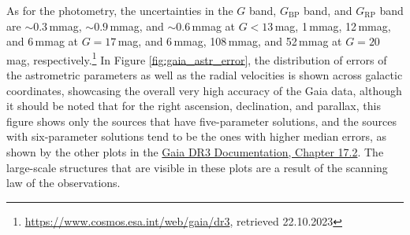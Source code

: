 \documentclass[a4paper,11pt]{article}
\begin{document}
%
As for the photometry, the uncertainties in the $G$ band, $G_\mathrm{BP}$ band, and $G_\mathrm{RP}$ band are ${\sim}0.3$\,mmag, ${\sim}0.9$\,mmag, and ${\sim}0.6$\,mmag at $G<13$\,mag, 1\,mmag, 12\,mmag, and 6\,mmag at $G=17$\,mag, and 6\,mmag, 108\,mmag, and 52\,mmag at $G=20$\,mag, respectively.\footnote{\url{https://www.cosmos.esa.int/web/gaia/dr3}, retrieved 22.10.2023} In Figure \ref{fig:gaia_astr_error}, the distribution of errors of the astrometric parameters as well as the radial velocities is shown across galactic coordinates, showcasing the overall very high accuracy of the Gaia data, although it should be noted that for the right ascension, declination, and parallax, this figure shows only the sources that have five-parameter solutions, and the sources with six-parameter solutions tend to be the ones with higher median errors, as shown by the other plots in the \href{https://gea.esac.esa.int/archive/documentation/GDR3/Catalogue_consolidation/chap_cu9gat/sec_cu9gat_catplots/}{Gaia DR3 Documentation, Chapter 17.2}. The large-scale structures that are visible in these plots are a result of the scanning law of the observations.
%
\end{document}
